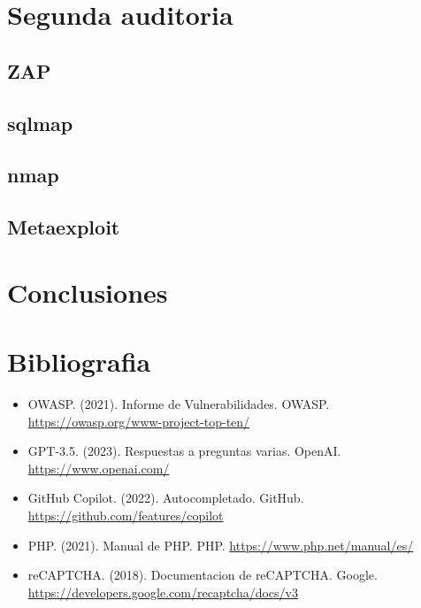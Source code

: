 \documentclass{report}
\begin{document}
            \clearpage
    \chapter{Segunda auditoria}
        \section{ZAP}
        \clearpage
        \section{sqlmap}
        \clearpage
        \section{nmap}
        \clearpage
        \section{Metaexploit}
        \clearpage
    \chapter{Conclusiones}
    \chapter{Bibliografia}
        \begin{itemize}
            \item OWASP. (2021). Informe de Vulnerabilidades. OWASP. \url{https://owasp.org/www-project-top-ten/}
            \item GPT-3.5. (2023). Respuestas a preguntas varias. OpenAI. \url{https://www.openai.com/}
            \item GitHub Copilot. (2022). Autocompletado. GitHub. \url{https://github.com/features/copilot}
            \item PHP. (2021). Manual de PHP. PHP. \url{https://www.php.net/manual/es/}
            \item reCAPTCHA. (2018). Documentacion de reCAPTCHA. Google. \url{https://developers.google.com/recaptcha/docs/v3}
        \end{itemize}
\end{document}
